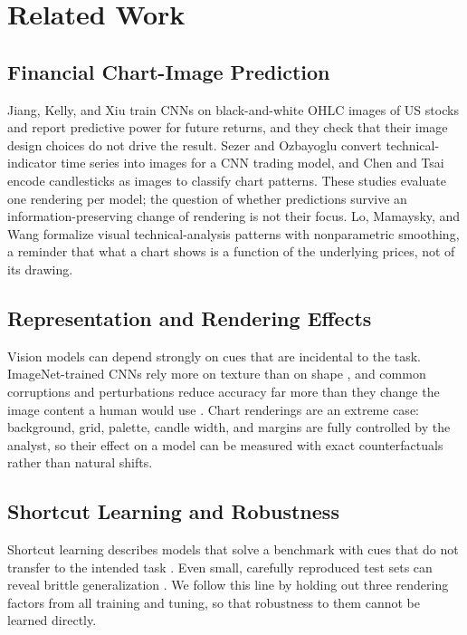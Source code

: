 \documentclass[10pt,journal,compsoc]{IEEEtran}
\begin{document}
\section{Related Work}\label{sec:related}
\subsection{Financial Chart-Image Prediction}
Jiang, Kelly, and Xiu \cite{jiang2023reimagining} train CNNs on black-and-white OHLC images of US stocks and report predictive power for future returns, and they check that their image design choices do not drive the result. Sezer and Ozbayoglu \cite{sezer2018cnnta} convert technical-indicator time series into images for a CNN trading model, and Chen and Tsai \cite{chen2020candlestick} encode candlesticks as images to classify chart patterns. These studies evaluate one rendering per model; the question of whether predictions survive an information-preserving change of rendering is not their focus. Lo, Mamaysky, and Wang \cite{lo2000foundations} formalize visual technical-analysis patterns with nonparametric smoothing, a reminder that what a chart shows is a function of the underlying prices, not of its drawing.

\subsection{Representation and Rendering Effects}
Vision models can depend strongly on cues that are incidental to the task. ImageNet-trained CNNs rely more on texture than on shape \cite{geirhos2019texture}, and common corruptions and perturbations reduce accuracy far more than they change the image content a human would use \cite{hendrycks2019benchmarking}. Chart renderings are an extreme case: background, grid, palette, candle width, and margins are fully controlled by the analyst, so their effect on a model can be measured with exact counterfactuals rather than natural shifts.

\subsection{Shortcut Learning and Robustness}
Shortcut learning describes models that solve a benchmark with cues that do not transfer to the intended task \cite{geirhos2020shortcut}. Even small, carefully reproduced test sets can reveal brittle generalization \cite{recht2019imagenet}. We follow this line by holding out three rendering factors from all training and tuning, so that robustness to them cannot be learned directly.
\end{document}
